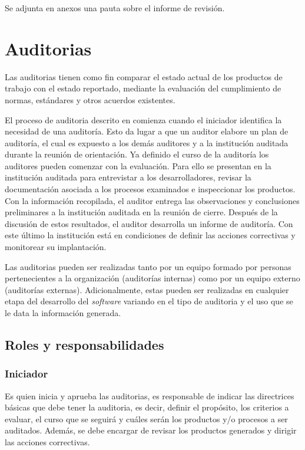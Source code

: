 Se adjunta en anexos una pauta sobre el informe de revisión.

\section{Auditorias}

Las auditorias tienen como fin comparar el estado actual de los productos de trabajo con el estado reportado, mediante la evaluación del cumplimiento de normas, estándares y otros acuerdos existentes.

El proceso de auditoria descrito en \citet{web00} comienza cuando el iniciador identifica la necesidad de una auditoría. Esto da lugar a que un auditor elabore un plan de auditoría, el cual es expuesto a los demás auditores y a la institución auditada durante la reunión de orientación. Ya definido el curso de la auditoría los auditores pueden comenzar con la evaluación. Para ello se presentan en la institución auditada para entrevistar a los desarrolladores, revisar la documentación asociada a los procesos examinados e inspeccionar los productos. Con la información recopilada, el auditor entrega las observaciones y conclusiones preliminares a la institución auditada en la reunión de cierre. Después de la discusión de estos resultados, el auditor desarrolla un informe de auditoría. Con este último la institución está en condiciones de definir las acciones correctivas y monitorear su implantación.

Las auditorias pueden ser realizadas tanto por un equipo formado por personas pertenecientes a la organización (auditorías internas) como por un equipo externo (auditorías externas). Adicionalmente, estas pueden ser realizadas en cualquier etapa del desarrollo del \textit{software} variando en el tipo de auditoria y el uso que se le data la información generada. 

\subsection{Roles y responsabilidades}

\subsubsection{Iniciador}

Es quien inicia y aprueba las auditorias, es responsable de indicar las directrices básicas que debe tener la auditoria, es decir, definir el propósito, los criterios a evaluar, el curso que se seguirá y cuáles serán los productos y/o procesos a ser auditados. Además, se debe encargar de revisar los productos generados y dirigir las acciones correctivas.

